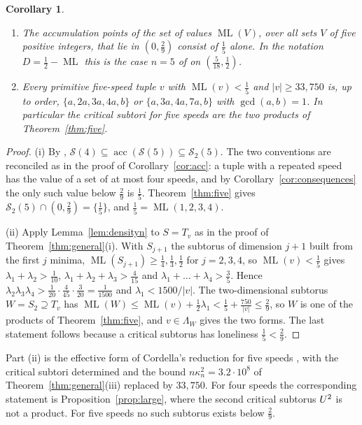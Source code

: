 \documentclass[12pt]{amsart}
\newtheorem{corollary}[theorem]{Corollary}
\theoremstyle{definition}\newtheorem{definition}[theorem]{Definition}
\theoremstyle{remark}\newtheorem{remark}[theorem]{Remark}
\newcommand{\ML}{\operatorname{ML}}
\newcommand{\eucl}[1]{\lvert #1\rvert}
\begin{document}
\begin{corollary}\label{cor:five}
\begin{enumerate}[label=\textup{(\roman*)},leftmargin=*]
\item The accumulation points of the set of values $\ML(V)$, over all sets $V$ of five positive integers, that lie in $(0,\frac29)$ consist of $\frac15$ alone. In the notation $D=\frac12-\ML$ this is the case $n=5$ of \cite[Conjecture~1.5]{GiriKravitz} on $(\frac5{18},\frac12)$.
\item Every primitive five-speed tuple $v$ with $\ML(v)<\frac15$ and $\eucl v\ge33{,}750$ is, up to order, $\{a,2a,3a,4a,b\}$ or $\{a,3a,4a,7a,b\}$ with $\gcd(a,b)=1$. In particular the critical subtori for five speeds are the two products of Theorem~\ref{thm:five}.
\end{enumerate}
\end{corollary}
\begin{proof}
(i) By \cite[Theorem~1.4]{GiriKravitz}, $\mathcal S(4)\subseteq\operatorname{acc}(\mathcal S(5))\subseteq\mathcal S_2(5)$. The two conventions are reconciled as in the proof of Corollary~\ref{cor:acc}: a tuple with a repeated speed has the value of a set of at most four speeds, and by Corollary~\ref{cor:consequences} the only such value below $\frac29$ is $\frac15$. Theorem~\ref{thm:five} gives $\mathcal S_2(5)\cap(0,\frac29)=\{\frac15\}$, and $\frac15=\ML(1,2,3,4)$.

(ii) Apply Lemma~\ref{lem:densityn} to $S=T_v$ as in the proof of Theorem~\ref{thm:general}(i). With $S_{j+1}$ the subtorus of dimension $j+1$ built from the first $j$ minima, $\ML(S_{j+1})\ge\frac14,\frac13,\frac12$ for $j=2,3,4$, so $\ML(v)<\frac15$ gives $\lambda_1+\lambda_2>\frac1{10}$, $\lambda_1+\lambda_2+\lambda_3>\frac4{15}$ and $\lambda_1+\dots+\lambda_4>\frac35$. Hence $\lambda_2\lambda_3\lambda_4>\frac1{20}\cdot\frac4{45}\cdot\frac3{20}=\frac1{1500}$ and $\lambda_1<1500/\eucl v$. The two-dimensional subtorus $W=S_2\supseteq T_v$ has $\ML(W)\le\ML(v)+\frac12\lambda_1<\frac15+\frac{750}{\eucl v}\le\frac29$, so $W$ is one of the products of Theorem~\ref{thm:five}, and $v\in\Lambda_W$ gives the two forms. The last statement follows because a critical subtorus has loneliness $\frac15<\frac29$.
\end{proof}

Part (ii) is the effective form of Cordella's reduction for five speeds \cite{Cordella}, with the critical subtori determined and the bound $n\kappa_n^2=3.2\cdot10^8$ of Theorem~\ref{thm:general}(iii) replaced by $33{,}750$. For four speeds the corresponding statement is Proposition~\ref{prop:large}, where the second critical subtorus $U^{2}$ is not a product. For five speeds no such subtorus exists below $\frac29$.
\end{document}
